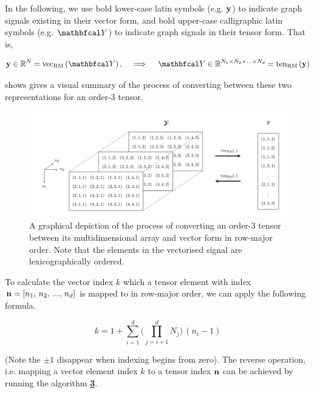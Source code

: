 In the following, we use bold lower-case latin symbols (e.g. $\mathbf{y}$) to indicate graph signals existing in their vector form, and bold upper-case calligraphic latin symbols (e.g. $\Yt$) to indicate graph signals in their tensor form. That is, 

\begin{align*}
    \y \in \R^{N} = \vecrm{\Yt}, \quad \implies \quad \Yt \in \R^{N_1 \times N_2 \times ... \times N_d} = \tenrm{\y}
\end{align*}

 shows gives a visual summary of the process of converting between these two representations for an order-3 tensor. 


\begin{figure}[t]
    \begin{center}
        \includegraphics[width=\linewidth]{Figures/Tensor_Digaram.pdf}    
    \end{center}
    \caption[Conversion between a multidimensional array and a vector]{A graphical depiction of the process of converting an order-3 tensor between its multidimensional array and vector form in row-major order. Note that the elements in the vectorised signal are lexicographically ordered. }
    \label{fig:ten_to_vec}
\end{figure}


To calculate the vector index $k$ which a tensor element with index $\mathbf{n} = [n_1,\, n_2,\, ...,\, n_d]$ is mapped to in row-major order, we can apply the following formula.  

\begin{equation}
    \label{eq:vec}
    k = 1 + \sum_{i=1}^d \Big( \prod_{j=i+1}^d N_j \Big) \, (n_i - 1)
\end{equation}

(Note the $\pm1$ disappear when indexing begins from zero). The reverse operation, i.e. mapping a vector element index $k$ to a tensor index $\mathbf{n}$ can be achieved by running the algorithm \hyperlink{vectoten}{\textbf{3}}. 


